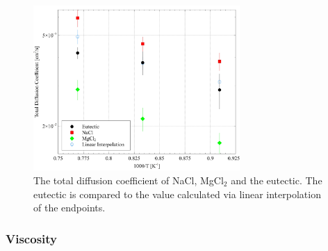 \documentclass[review]{elsarticle}
\begin{document}
\begin{figure}[!h]
 \centering
 \includegraphics[width=0.7\textwidth]{diff_total_namgcl.jpg} 
 \caption{The total diffusion coefficient of NaCl, MgCl$_2$ and the eutectic. The eutectic is compared to the value calculated via linear interpolation of the endpoints.}
 \label{fig:NaMgCl_total_diff}
\end{figure}
\FloatBarrier



\subsubsection{Viscosity}
\end{document}
